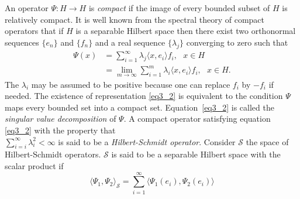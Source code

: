An operator $\Psi: H \rightarrow H$ is \textit{compact} if the image of every bounded subset of $H$ is relatively compact. It is well known from the spectral theory of compact operators that if $H$ is a separable Hilbert space then there exist two orthonormal sequences $\{e_n\}$ and $\{f_n\}$ and a real sequence $\{\lambda_j\}$ converging to zero such that
\begin{align}\label{eq3_2}
\Psi(x) &= \sum_{i=1}^{\infty} \lambda_j \langle x,e_i \rangle f_i, \text{ } x \in H \nonumber \\
&= \lim\limits_{m \rightarrow \infty} \sum_{i=1}^{m} \lambda_i \langle x,e_i \rangle f_i, \text{ } x \in H.
\end{align}
The $\lambda_i$ may be assumed to be positive because one can replace $f_i$ by $-f_i$ if needed. The existence of representation \eqref{eq3_2} is equivalent to the condition $\Psi$ maps every bounded set into a compact set. Equation~\eqref{eq3_2} is called the \textit{singular value decomposition} of $\Psi$. A compact operator satisfying equation \eqref{eq3_2} with the property that\\ $\sum_{i=i}^{\infty} \lambda_i^2 < \infty$ is said to be a \textit{Hilbert-Schmidt operator}. Consider $\mathcal{S}$ the space of Hilbert-Schmidt operators. $\mathcal{S}$ is said to be a separable Hilbert space with the scalar product if
\begin{equation}\label{eq_33}
\langle \Psi_1 , \Psi_2\rangle_{\mathcal{S}} = \sum_{i=1}^{\infty} \langle \Psi_1(e_i) , \Psi_2 (e_i)\rangle
\end{equation}

